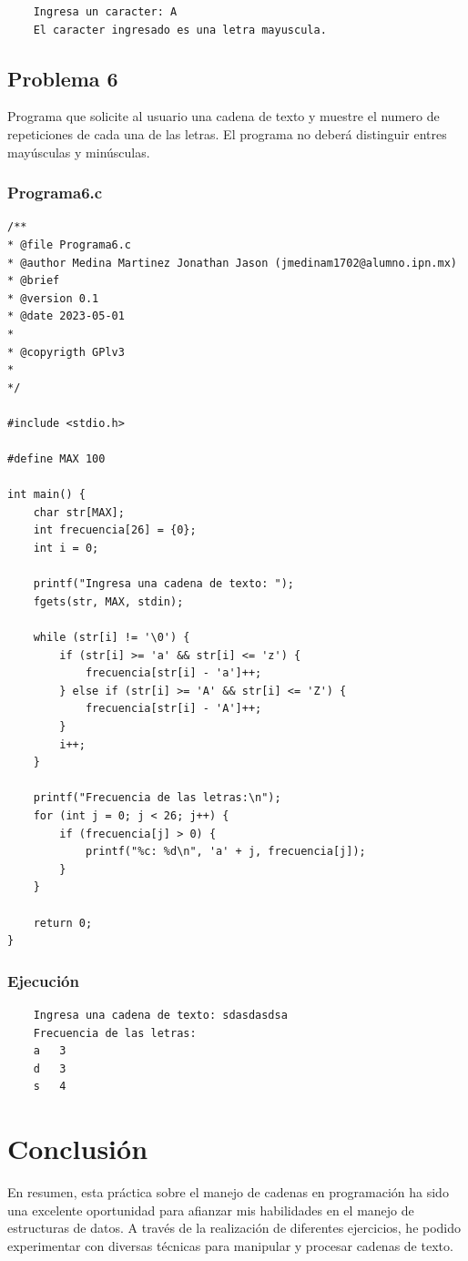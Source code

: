 \documentclass{article}
\begin{document}
	\begin{lstlisting}
	Ingresa un caracter: A
	El caracter ingresado es una letra mayuscula.
	\end{lstlisting}
	
	\newpage
	
	\subsection{Problema 6}
	
	Programa que solicite al usuario una cadena de texto y muestre el numero de repeticiones de cada una de las letras. El programa no deberá distinguir entres mayúsculas y minúsculas.
	
	\subsubsection{Programa6.c}
	
	\begin{lstlisting}
/**
* @file Programa6.c
* @author Medina Martinez Jonathan Jason (jmedinam1702@alumno.ipn.mx)
* @brief 
* @version 0.1
* @date 2023-05-01
* 
* @copyrigth GPlv3
* 
*/

#include <stdio.h>

#define MAX 100

int main() {
	char str[MAX];
	int frecuencia[26] = {0};
	int i = 0;
	
	printf("Ingresa una cadena de texto: ");
	fgets(str, MAX, stdin);
	
	while (str[i] != '\0') {
		if (str[i] >= 'a' && str[i] <= 'z') {
			frecuencia[str[i] - 'a']++;
		} else if (str[i] >= 'A' && str[i] <= 'Z') {
			frecuencia[str[i] - 'A']++;
		}
		i++;
	}
	
	printf("Frecuencia de las letras:\n");
	for (int j = 0; j < 26; j++) {
		if (frecuencia[j] > 0) {
			printf("%c: %d\n", 'a' + j, frecuencia[j]);
		}
	}
	
	return 0;
}
	\end{lstlisting}
	
	\subsubsection{Ejecución}
	
	\begin{lstlisting}
	Ingresa una cadena de texto: sdasdasdsa
	Frecuencia de las letras:
	a   3
	d   3
	s   4
	\end{lstlisting}
	
	\newpage
	\section{Conclusión}
	
	En resumen, esta práctica sobre el manejo de cadenas en programación ha sido una excelente oportunidad para afianzar mis habilidades en el manejo de estructuras de datos. A través de la realización de diferentes ejercicios, he podido experimentar con diversas técnicas para manipular y procesar cadenas de texto.
	
\end{document}
